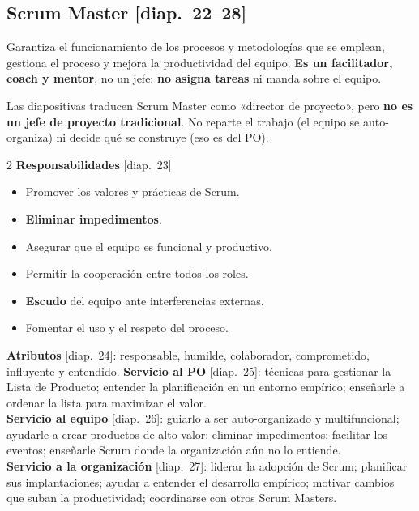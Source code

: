 \documentclass[11pt,a4paper,oneside,openany]{report}
\newcommand{\diap}[1]{\textcolor{mdaPrimary}{\small[diap.~#1]}}
\begin{document}
\subsection{Scrum Master \diap{22--28}}
\begin{definicion}
Garantiza el funcionamiento de los procesos y metodologías que se emplean, gestiona el proceso y mejora la
productividad del equipo. \textbf{Es un facilitador, coach y mentor}, no un jefe: \textbf{no asigna tareas} ni
manda sobre el equipo.
\end{definicion}
\begin{aviso}
Las diapositivas traducen Scrum Master como «director de proyecto», pero \textbf{no es un jefe de proyecto
tradicional}. No reparte el trabajo (el equipo se auto-organiza) ni decide qué se construye (eso es del PO).
\end{aviso}
\begin{multicols}{2}\small
\textbf{Responsabilidades} \diap{23}
\begin{itemize}[leftmargin=*,itemsep=1pt]
  \item Promover los valores y prácticas de Scrum.
  \item \textbf{Eliminar impedimentos}.
  \item Asegurar que el equipo es funcional y productivo.
  \item Permitir la cooperación entre todos los roles.
  \item \textbf{Escudo} del equipo ante interferencias externas.
  \item Fomentar el uso y el respeto del proceso.
\end{itemize}
\textbf{Atributos} \diap{24}: responsable, humilde, colaborador, comprometido, influyente y entendido.
\columnbreak
\textbf{Servicio al PO} \diap{25}: técnicas para gestionar la Lista de Producto; entender la planificación en un
entorno empírico; enseñarle a ordenar la lista para maximizar el valor.\\[4pt]
\textbf{Servicio al equipo} \diap{26}: guiarlo a ser auto-organizado y multifuncional; ayudarle a crear productos de
alto valor; eliminar impedimentos; facilitar los eventos; enseñarle Scrum donde la organización aún no lo entiende.\\[4pt]
\textbf{Servicio a la organización} \diap{27}: liderar la adopción de Scrum; planificar sus implantaciones; ayudar a
entender el desarrollo empírico; motivar cambios que suban la productividad; coordinarse con otros Scrum Masters.
\end{multicols}
\end{document}
